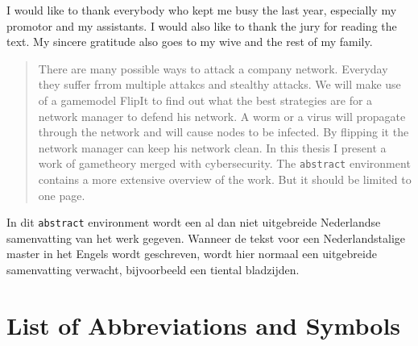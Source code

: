 \documentclass[master=cws, masteroption=vs]{kulemt}
\begin{document}
\begin{preface}
  I would like to thank everybody who kept me busy the last year,
  especially my promotor and my assistants. I would also like to thank the
  jury for reading the text. My sincere gratitude also goes to my wive and
  the rest of my family.
\end{preface}

\tableofcontents*
\listoftodos
\begin{abstract}
There are many possible ways to attack a company network. Everyday they suffer frrom multiple attakcs and stealthy attacks.
We will make use of a gamemodel FlipIt to find out what the best strategies are for a network manager to defend his network. A worm or a virus will propagate through the network and will cause nodes to be infected. By flipping it the network manager can keep his network clean.
In this thesis I present a work of gametheory merged with cybersecurity. 
  The \texttt{abstract} environment contains a more extensive overview of
  the work. But it should be limited to one page.


\end{abstract}

\begin{abstract*}
  In dit \texttt{abstract} environment wordt een al dan niet uitgebreide
  Nederlandse samenvatting van het werk gegeven.
  Wanneer de tekst voor een Nederlandstalige master in het Engels wordt
  geschreven, wordt hier normaal een uitgebreide samenvatting verwacht,
  bijvoorbeeld een tiental bladzijden. 

  \lipsum[1]
\end{abstract*}

\listoffiguresandtables
\chapter{List of Abbreviations and Symbols}
\end{document}

